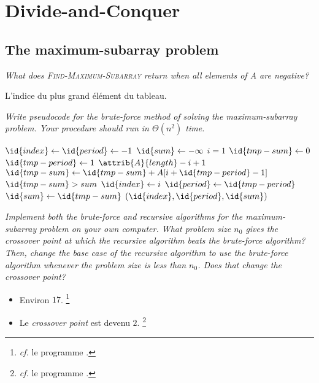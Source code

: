 \section{Divide-and-Conquer}

\subsection{The maximum-subarray problem}

\begin{description}
   {\itshape What does {\scshape Find-Maximum-Subarray} return when all elements of A are negative?} 
    \begin{ex}
      L'indice du plus grand \'el\'ement du tableau.
    \end{ex}

   {\itshape Write pseudocode for the brute-force method of solving the maximum-subarray problem. Your procedure should run in $\Theta(n^2)$ time.}

    \begin{ex}
      \begin{codebox}
        \li $\id{index} \gets  \id{period} \gets -1$
        \li $\id{sum} \gets -\infty$
        \li \For $i=1$ \To {} \Do
        \li $\id{tmp-sum} \gets 0$
        \li \For $\id{tmp-period} \gets 1$ \To $\attrib{A}{length} - i+1$ \Do
        \li $\id{tmp-sum} \gets \id{tmp-sum} + A[i + \id{tmp-period}-1]$
        \li \If $\id{tmp-sum} > sum$ \Then
        \li $\id{index} \gets i$
        \li $\id{period} \gets \id{tmp-period} $
        \li $\id{sum} \gets \id{tmp-sum}$ \End \End \End
        \li \Return $(\id{index}, \id{period}, \id{sum})$
      \end{codebox}
    \end{ex}

   {\itshape Implement both the brute-force and recursive algorithms for the maximum-subarray problem on your own computer. What problem size $n_0$ gives the crossover point at which the recursive algorithm beats the brute-force algorithm? Then, change the base case of the recursive algorithm to use the brute-force algorithm whenever the problem size is less than $n_0$. Does that change the crossover point?}
    \begin{ex}
        \begin{itemize}
          \item Environ $17$. \footnote{\textit{cf.} le programme .}
          \item Le {\itshape crossover point} est devenu $2$. \footnote{\textit{cf.} le programme .}
        \end{itemize}
    \end{ex}


\end{description}
